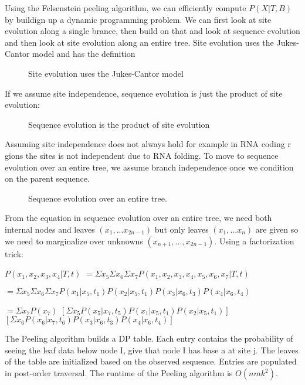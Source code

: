 Using the Felsenstein peeling algorithm, we can efficiently compute
$P(X|T,B)$ by buildign up a dynamic programming problem. We can first
look at site evolution along a single brance, then build on that and
look at sequence evolution and then look at site evolution along an
entire tree. Site evolution uses the Jukes-Cantor model and has the
definition

\begin{figure}[ht!]
  \centering
  \caption{Site evolution uses the Jukes-Cantor model}
  \label{Fig03_SiteEvolution}
\end{figure}
\noindent If we assume site independence, sequence evolution is just
the product of site evolution:

\begin{figure}[ht!]
  \centering
  \caption{Sequence evolution is the product of site evolution}
  \label{Fig04_SequenceEvolution}
\end{figure}

\noindent Assuming site independence does not always hold for example
in RNA coding r gions the sites is not independent due to RNA
folding. To move to sequence evolution over an entire tree, we assume
branch independence once we condition on the parent sequence.

\begin{figure}[ht!]
  \centering
  \caption{Sequence evolution over an entire tree.}
  \label{Fig05_SequenceEvolutionOverTree}
\end{figure}

\noindent From the equation in sequence evolution over an entire tree,
we need both internal nodes and leaves $(x_1,...x_{2n-1})$ but only
leaves $(x_1,...x_n)$ are given so we need to marginalize over
unknowns $(x_{n+1},...,x_{2n-1})$. Using a factorization trick:

$P(x_1,x_2,x_3,x_4|T,t)$ 
$= \Sigma x_5 \Sigma x_6 \Sigma x_7 P(x_1,x_2,x_3,x_4,x_5,x_6,x_7|T,t)$

$= \Sigma x_5 \Sigma x_6 \Sigma x_7 P(x_1|x_5,t_1)P(x_2|x_5,t_1)P(x_3|x_6,t_3)P(x_4|x_6,t_4)$ 

$= \Sigma x_7 P(x_7)$
$[\Sigma x_5 P(x_5|x_7,t_5)P(x_1|x_5,t_1)P(x_2|x_5,t_1)]$
$[\Sigma x_6 P(x_6|x_7,t_6)P(x_3|x_6,t_3)P(x_4|x_6,t_4)]$

\noindent The Peeling algorithm builds a DP table. Each entry contains
the probability of seeing the leaf data below node I, give that node I
has base a at site j. The leaves of the table are initialized based on
the observed sequence. Entries are populated in post-order
traversal. The runtime of the Peeling algorithm is $O(nmk^2)$.

